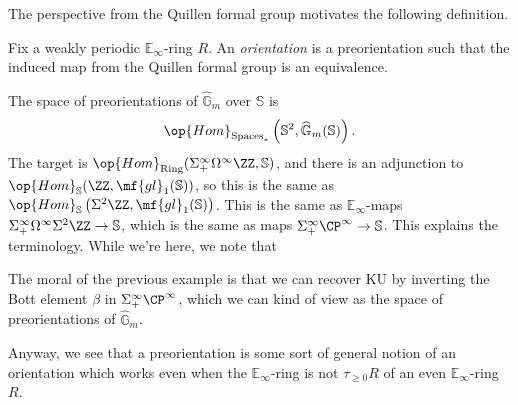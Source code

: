 \documentclass[../notes.tex]{subfiles}
\begin{document}
The perspective from the Quillen formal group motivates the following definition.
\begin{definition}[orientation]
	Fix a weakly periodic $\mathbb E_\infty$-ring $R$. An \textit{orientation} is a preorientation such that the induced map from the Quillen formal group is an equivalence.
\end{definition}
\begin{example}
	The space of preorientations of $\widehat{\mathbb G}_m$ over $\mathbb S$ is
	\[\op{Hom}_{\mathrm{Spaces}_*}\left(\mathbb S^2,\widehat{\mathbb G}_m(\mathbb S)\right).\]
	The target is $\op{Hom}_{\mathrm{Ring}}(\Sigma^\infty_+\Omega^\infty\ZZ,\mathbb S)$, and there is an adjunction to $\op{Hom}_\mathbb S(\ZZ,\mf{gl}_1(\mathbb S))$, so this is the same as $\op{Hom}_\mathbb S\left(\Sigma^2\ZZ,\mf{gl}_1(\mathbb S)\right)$. This is the same as $\mathbb E_\infty$-maps $\Sigma_+^\infty\Omega^\infty\Sigma^2\ZZ\to\mathbb S$, which is the same as maps $\Sigma_+^\infty\CP^\infty\to\mathbb S$. This explains the terminology. While we're here, we note that 
\end{example}
\begin{remark}
	The moral of the previous example is that we can recover $\mathrm{KU}$ by inverting the Bott element $\beta$ in $\Sigma^\infty_+\CP^\infty$, which we can kind of view as the space of preorientations of $\widehat{\mathbb G}_m$.
\end{remark}
Anyway, we see that a preorientation is some sort of general notion of an orientation which works even when the $\mathbb E_\infty$-ring is not $\tau_{\ge0}R$ of an even $\mathbb E_\infty$-ring $R$.
\end{document}
